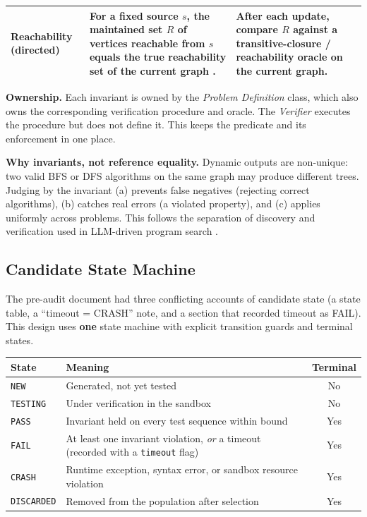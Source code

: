 \documentclass[12pt,a4paper]{article}
\begin{document}
\begin{longtable}{|p{2.6cm}|p{8.2cm}|p{3.6cm}|}
\hline
Reachability (directed) & For a fixed source $s$, the maintained set $R$ of vertices reachable from $s$ equals the true reachability set of the current graph \cite{demetrescu2005dynamic,bernstein2023}. & After each update, compare $R$ against a transitive-closure / reachability oracle on the current graph. \\
\hline
\end{longtable}

\textbf{Ownership.} Each invariant is owned by the \emph{Problem Definition} class, which also owns the corresponding verification procedure and oracle. The \emph{Verifier} executes the procedure but does not define it. This keeps the predicate and its enforcement in one place.

\textbf{Why invariants, not reference equality.} Dynamic outputs are non-unique: two valid BFS or DFS algorithms on the same graph may produce different trees. Judging by the invariant (a) prevents false negatives (rejecting correct algorithms), (b) catches real errors (a violated property), and (c) applies uniformly across problems. This follows the separation of discovery and verification used in LLM-driven program search \cite{openai2025codex,funsearch2023,alphaevolve2025}.

\subsection{Candidate State Machine}

The pre-audit document had three conflicting accounts of candidate state (a state table, a ``timeout = CRASH'' note, and a section that recorded timeout as FAIL). This design uses \textbf{one} state machine with explicit transition guards and terminal states.

\begin{center}
\renewcommand{\arraystretch}{1.2}
\begin{tabular}{|l|p{7.5cm}|c|}
\toprule
\textbf{State} & \textbf{Meaning} & \textbf{Terminal} \\
\midrule
\texttt{NEW} & Generated, not yet tested & No \\
\texttt{TESTING} & Under verification in the sandbox & No \\
\texttt{PASS} & Invariant held on every test sequence within bound & Yes \\
\texttt{FAIL} & At least one invariant violation, \emph{or} a timeout (recorded with a \texttt{timeout} flag) & Yes \\
\texttt{CRASH} & Runtime exception, syntax error, or sandbox resource violation & Yes \\
\texttt{DISCARDED} & Removed from the population after selection & Yes \\
\bottomrule
\end{tabular}
\end{center}
\end{document}
